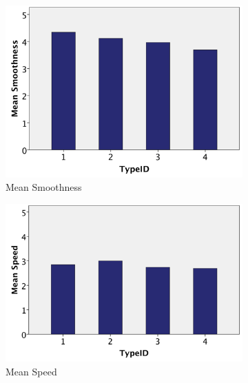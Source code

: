 \begin{figure}[H]
    \centering
    \begin{subfigure}[b]{0.4\textwidth}
        \centering
        \includegraphics[width=\textwidth]{figures/meanSmoothness}
        \caption{Mean Smoothness}
        \label{fig:meanSmoothness}
    \end{subfigure}
    \hfill
    \begin{subfigure}[b]{0.4\textwidth}
        \centering
        \includegraphics[width=\textwidth]{figures/meanSpeed}
        \caption{Mean Speed }
        \label{fig:meanSpeed}
    \end{subfigure}
    \hfill
    \begin{subfigure}[b]{0.4\textwidth}
        \centering

\end{subfigure}
\end{figure}
